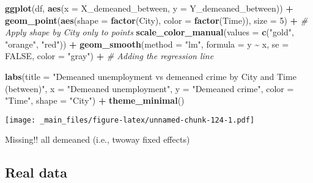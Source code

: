 \documentclass[
]{book}
\newenvironment{Shaded}{\begin{snugshade}}{\end{snugshade}}
\newcommand{\AttributeTok}[1]{\textcolor[rgb]{0.13,0.29,0.53}{#1}}
\newcommand{\CommentTok}[1]{\textcolor[rgb]{0.56,0.35,0.01}{\textit{#1}}}
\newcommand{\ConstantTok}[1]{\textcolor[rgb]{0.56,0.35,0.01}{#1}}
\newcommand{\DecValTok}[1]{\textcolor[rgb]{0.00,0.00,0.81}{#1}}
\newcommand{\FunctionTok}[1]{\textcolor[rgb]{0.13,0.29,0.53}{\textbf{#1}}}
\newcommand{\NormalTok}[1]{#1}
\newcommand{\SpecialCharTok}[1]{\textcolor[rgb]{0.81,0.36,0.00}{\textbf{#1}}}
\newcommand{\StringTok}[1]{\textcolor[rgb]{0.31,0.60,0.02}{#1}}
\begin{document}
\begin{Shaded}
\begin{Highlighting}[]
\FunctionTok{ggplot}\NormalTok{(df, }\FunctionTok{aes}\NormalTok{(}\AttributeTok{x =}\NormalTok{ X\_demeaned\_between, }\AttributeTok{y =}\NormalTok{ Y\_demeaned\_between)) }\SpecialCharTok{+}
  \FunctionTok{geom\_point}\NormalTok{(}\FunctionTok{aes}\NormalTok{(}\AttributeTok{shape =} \FunctionTok{factor}\NormalTok{(City), }\AttributeTok{color =} \FunctionTok{factor}\NormalTok{(Time)), }\AttributeTok{size =} \DecValTok{5}\NormalTok{) }\SpecialCharTok{+}  \CommentTok{\# Apply shape by City only to points}
  \FunctionTok{scale\_color\_manual}\NormalTok{(}\AttributeTok{values =} \FunctionTok{c}\NormalTok{(}\StringTok{"gold"}\NormalTok{, }\StringTok{"orange"}\NormalTok{, }\StringTok{"red"}\NormalTok{)) }\SpecialCharTok{+}
  \FunctionTok{geom\_smooth}\NormalTok{(}\AttributeTok{method =} \StringTok{"lm"}\NormalTok{, }\AttributeTok{formula =}\NormalTok{ y }\SpecialCharTok{\textasciitilde{}}\NormalTok{ x, }\AttributeTok{se =} \ConstantTok{FALSE}\NormalTok{, }\AttributeTok{color =} \StringTok{"gray"}\NormalTok{) }\SpecialCharTok{+}  \CommentTok{\# Adding the regression line}
  
  \FunctionTok{labs}\NormalTok{(}\AttributeTok{title =} \StringTok{"Demeaned unemployment vs demeaned crime by City and Time (between)"}\NormalTok{,}
       \AttributeTok{x =} \StringTok{"Demeaned unemployment"}\NormalTok{,}
       \AttributeTok{y =} \StringTok{"Demeaned crime"}\NormalTok{,}
       \AttributeTok{color =} \StringTok{"Time"}\NormalTok{,}
       \AttributeTok{shape =} \StringTok{"City"}\NormalTok{) }\SpecialCharTok{+}
  \FunctionTok{theme\_minimal}\NormalTok{()}
\end{Highlighting}
\end{Shaded}

\texttt{[image: \_main\_files/figure-latex/unnamed-chunk-124-1.pdf]}

{Missing!! all demeaned (i.e., twoway fixed effects)}

\hypertarget{real-data-2}{%
\subsection{Real data}\label{real-data-2}}
\end{document}
